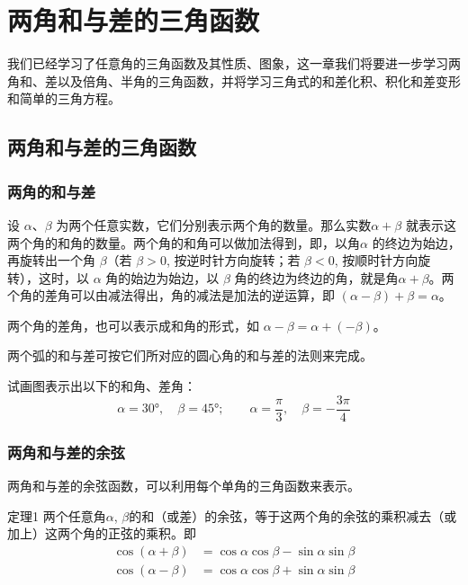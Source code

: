 \chapter{两角和与差的三角函数}
我们已经学习了任意角的三角函数及其性质、图象，这一章我们将要进一步学习两角和、差以及倍角、半角的三角函数，并将学习三角式的和差化积、积化和差变形和简单的三角方程。
\section{两角和与差的三角函数}
\subsection{两角的和与差}
设 $\alpha$、$\beta$ 为两个任意实数，它们分别表示两个角的数量。那么实数$\alpha+\beta$ 就表示这两个角的和角的数量。两个角的和角可以做加法得到，即，以角$\alpha$ 的终边为始边，再旋转出一个角 $\beta$（若 $\beta>0$, 按逆时针方向旋转；若 $\beta<0$, 按顺时针方向旋转），这时，以 $\alpha$ 角的始边为始边，以 $\beta$ 角的终边为终边的角，就是角$\alpha +\beta$。两个角的差角可以由减法得出，角的减法是加法的逆运算，即 $(\alpha -\beta)+\beta=\alpha$。

两个角的差角，也可以表示成和角的形式，如 $\alpha -\beta=\alpha + (-\beta)$。

两个弧的和与差可按它们所对应的圆心角的和与差的法则来完成。

\begin{ex}
    试画图表示出以下的和角、差角：
    \[\alpha=\ang{30},\quad \beta=\ang{45}; \qquad \alpha=\frac{\pi}{3},\quad \beta=-\frac{3\pi}{4} \]
\end{ex}

\subsection{两角和与差的余弦}
两角和与差的余弦函数，可以利用每个单角的三角函数来表示。

\begin{blk}{定理1}
    两个任意角$\alpha$, $\beta$的和（或差）的余弦，等于这两个角的余弦的乘积减去（或加上）这两个角的正弦的乘积。即
\begin{align}
    \cos (\alpha+\beta) &=\cos\alpha\cos\beta-\sin\alpha\sin\beta\\
\cos (\alpha-\beta) &=\cos\alpha\cos\beta+\sin\alpha\sin\beta
\end{align}
\end{blk}
 
